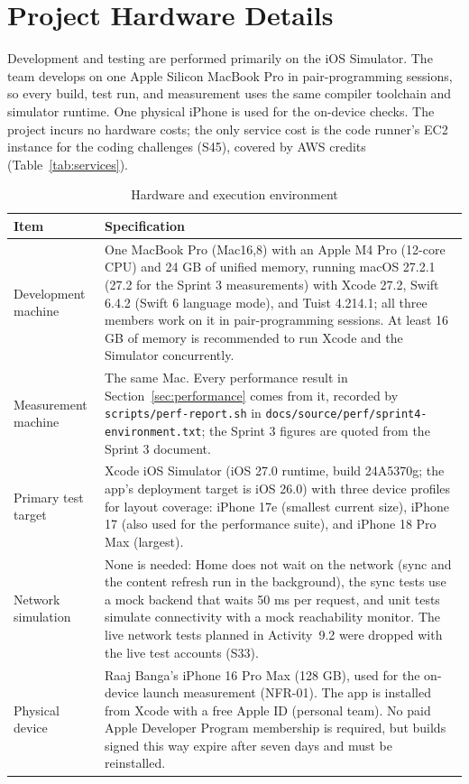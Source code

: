\documentclass[12pt,letterpaper]{article}
\begin{document}
\section{Project Hardware Details}
Development and testing are performed primarily on the iOS Simulator. The team
develops on one Apple Silicon MacBook Pro in pair-programming sessions, so every
build, test run, and measurement uses the same compiler toolchain and simulator
runtime. One physical iPhone is used for the on-device checks. The
project incurs no hardware costs; the only service cost is the code runner's EC2
instance for the coding challenges (S45), covered by AWS credits
(Table~\ref{tab:services}).

\begin{table}[H]
\centering
\caption{Hardware and execution environment}
\label{tab:hardware}
\begin{tabularx}{\textwidth}{@{}L{3.3cm} Y@{}}
\toprule
\textbf{Item} & \textbf{Specification} \\
\midrule
Development machine & One MacBook Pro (Mac16,8) with an Apple M4 Pro (12-core CPU) and 24 GB of unified memory, running macOS 27.2.1 (27.2 for the Sprint 3 measurements) with Xcode 27.2, Swift 6.4.2 (Swift 6 language mode), and Tuist 4.214.1; all three members work on it in pair-programming sessions. At least 16 GB of memory is recommended to run Xcode and the Simulator concurrently. \\
Measurement machine & The same Mac. Every performance result in Section~\ref{sec:performance} comes from it, recorded by \texttt{scripts/perf-report.sh} in \texttt{docs/source/perf/sprint4-environment.txt}; the Sprint 3 figures are quoted from the Sprint 3 document. \\
Primary test target & Xcode iOS Simulator (iOS 27.0 runtime, build 24A5370g; the app's deployment target is iOS 26.0) with three device profiles for layout coverage: iPhone 17e (smallest current size), iPhone 17 (also used for the performance suite), and iPhone 18 Pro Max (largest). \\
Network simulation & None is needed: Home does not wait on the network (sync and the content refresh run in the background), the sync tests use a mock backend that waits 50 ms per request, and unit tests simulate connectivity with a mock reachability monitor. The live network tests planned in Activity~9.2 were dropped with the live test accounts (S33). \\
Physical device & Raaj Banga's iPhone 16 Pro Max (128 GB), used for the on-device launch measurement (NFR-01). The app is installed from Xcode with a free Apple ID (personal team). No paid Apple Developer Program membership is required, but builds signed this way expire after seven days and must be reinstalled. \\

\end{tabularx}
\end{table}
\end{document}
